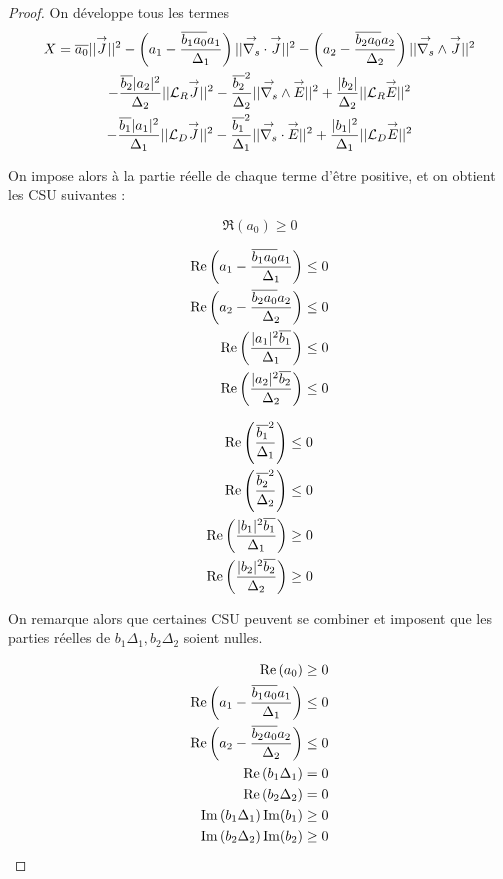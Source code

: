 \begin{proof}
    On développe tous les termes
    \begin{multline}
      X = {\overline{a_0}} || {\overset{\rightarrow}{J}} ||^2 - \left(a_1 - \dfrac{{\overline{b_1a_0}}a_1}{\Delta_1}\right) || {\overset{\rightarrow}{\nabla_s}} \cdot {\overset{\rightarrow}{J}} ||^2 - \left(a_2 - \dfrac{{\overline{b_2a_0}}a_2}{\Delta_2}\right) || {\overset{\rightarrow}{\nabla_s}} \wedge {\overset{\rightarrow}{J}} ||^2
      \\
      - \dfrac{{\overline{b_2}}|a_2|^2}{\Delta_2}||{\mathcal{L}_R} {\overset{\rightarrow}{J}}||^2  -  \dfrac{{\overline{b_2}}^2}{\Delta_2}||{\overset{\rightarrow}{\nabla_s}} \wedge{\overset{\rightarrow}{E}}||^2 +  \dfrac{|b_2|}{\Delta_2} ||{\mathcal{L}_R} {\overset{\rightarrow}{E}} ||^2
      \\
      - \dfrac{{\overline{b_1}}|a_1|^2}{\Delta_1}||{\mathcal{L}_D} {\overset{\rightarrow}{J}}||^2  - \dfrac{{\overline{b_1}}^2}{\Delta_1}||{\overset{\rightarrow}{\nabla_s}} \cdot{\overset{\rightarrow}{E}}||^2 + \dfrac{|b_1|^2}{\Delta_1} ||{\mathcal{L}_D} {\overset{\rightarrow}{E}} ||^2
    \end{multline}

    On impose alors à la partie réelle de chaque terme d'être positive, et on obtient les CSU suivantes :

    \begin{equation}
      \Re\left(a_0\right)\ge 0
    \end{equation}
    \begin{minipage}{0.5\textwidth}
      \begin{align}
        \operatorname{Re}\left(a_1 - \dfrac{{\overline{b_1a_0}}a_1}{\Delta_1}\right) \le 0 \\
        \operatorname{Re}\left(a_2 - \dfrac{{\overline{b_2a_0}}a_2}{\Delta_2}\right) \le 0 \\
        \operatorname{Re}\left(\dfrac{|a_1|^2{\overline{b_1}}}{\Delta_1}\right) \le 0 \\
        \operatorname{Re}\left(\dfrac{|a_2|^2{\overline{b_2}}}{\Delta_2}\right) \le 0
      \end{align}
    \end{minipage}
    \begin{minipage}{0.5\textwidth}
      \begin{align}
        \operatorname{Re}\left(\dfrac{{\overline{b_1}}^2}{\Delta_1}\right) \le 0 \\
        \operatorname{Re}\left(\dfrac{{\overline{b_2}}^2}{\Delta_2}\right) \le 0 \\
        \operatorname{Re}\left(\dfrac{|b_1|^2{\overline{b_1}}}{\Delta_1}\right) \ge 0 \\
        \operatorname{Re}\left(\dfrac{|b_2|^2{\overline{b_2}}}{\Delta_2}\right) \ge 0
      \end{align}
    \end{minipage}

    On remarque alors que certaines CSU peuvent se combiner et imposent que les parties réelles de \(b_1\Delta_1,b_2\Delta_2\) soient nulles.

    \begin{align}
      \operatorname{Re}\left(a_0\right)\ge 0 \\
      \operatorname{Re}\left(a_1 - \dfrac{{\overline{b_1a_0}}a_1}{\Delta_1}\right) \le 0 \\
      \operatorname{Re}\left(a_2 - \dfrac{{\overline{b_2a_0}}a_2}{\Delta_2}\right) \le 0 \\
      \operatorname{Re}\left(b_1\Delta_1\right) = 0 \\
      \operatorname{Re}\left(b_2\Delta_2\right) = 0 \\
      \operatorname{Im}\left(b_1\Delta_1\right)\operatorname{Im}(b_1)\ge 0\\
      \operatorname{Im}\left(b_2\Delta_2\right)\operatorname{Im}(b_2)\ge 0
    \end{align}
  \end{proof}

